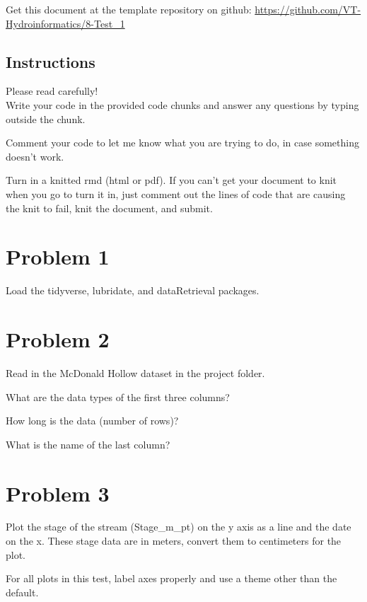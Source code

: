 \documentclass[
]{book}
\begin{document}
Get this document at the template repository on github: \url{https://github.com/VT-Hydroinformatics/8-Test_1}

\hypertarget{instructions}{%
\subsection{Instructions}\label{instructions}}

Please read carefully!\\

Write your code in the provided code chunks and answer any questions by typing outside the chunk.

Comment your code to let me know what you are trying to do, in case something doesn't work.

Turn in a knitted rmd (html or pdf). If you can't get your document to knit when you go to turn it in, just comment out the lines of code that are causing the knit to fail, knit the document, and submit.

\hypertarget{problem-1-3}{%
\section{Problem 1}\label{problem-1-3}}

Load the tidyverse, lubridate, and dataRetrieval packages.

\hypertarget{problem-2-3}{%
\section{Problem 2}\label{problem-2-3}}

Read in the McDonald Hollow dataset in the project folder.

What are the data types of the first three columns?

How long is the data (number of rows)?

What is the name of the last column?

\hypertarget{problem-3-3}{%
\section{Problem 3}\label{problem-3-3}}

Plot the stage of the stream (Stage\_m\_pt) on the y axis as a line and the date on the x. These stage data are in meters, convert them to centimeters for the plot.

For all plots in this test, label axes properly and use a theme other than the default.
\end{document}
